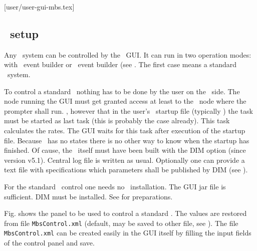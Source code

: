 [user/user-gui-mbs.tex]
\label{user-gui-mbs-chapter}
\subsection[MBS setup]{\mbs\ setup}
Any \mbs\ system can be controlled by the \dabc\ GUI.
It can run in two operation modes: with \mbs\ event builder or \dabc\ event builder
(see .
The first case means a standard \mbs\ system.

To control a standard \mbs\ nothing has to be done by the user on the \mbs\ side.
The node running the GUI must get granted  access at least to the
\mbs\ node where the prompter shall run.
, however that in the user's \mbs\ startup file (typically ) the  task must be
started as last task (this is probably the case already).
This task calculates the rates. The GUI waits for this task after execution of
the startup file. Because \mbs\ has no states there is no other way to
know when the startup has finished.
Of cause, the \mbs\ itself must have been built with the DIM option (since version v5.1).
Central log file is written as usual.
Optionally one can provide a text file with specifications which parameters
shall be published by DIM (see ).

For the standard \mbs\ control one needs no \dabc\ installation.
The GUI jar file is sufficient. DIM must be installed.
See  for preparations.

Fig.  shows the panel to be used to control
a standard \mbs.
The values are restored from file {\tt MbsControl.xml} (default, may be saved to other file,
see ).
The file {\tt MbsControl.xml} can be created easily in the GUI itself
by filling the input fields of the control panel and save.

